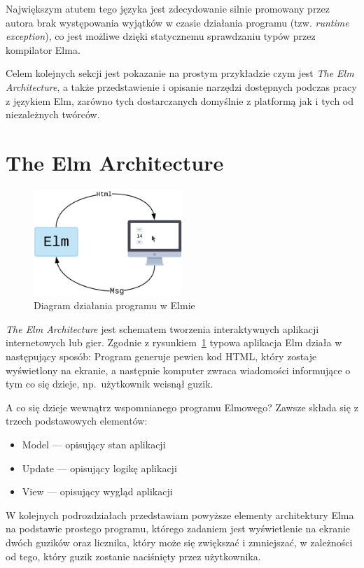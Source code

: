 \documentclass[twoside,a4paper]{report}
\begin{document}
Największym atutem tego języka jest zdecydowanie silnie promowany przez autora brak występowania wyjątków w czasie działania programu (tzw. \textit{runtime exception}), co jest możliwe dzięki statycznemu sprawdzaniu typów przez kompilator Elma.

Celem kolejnych sekcji jest pokazanie na prostym przykładzie czym jest \textit{The Elm Architecture}, a także przedstawienie i opisanie narzędzi dostępnych podczas pracy z językiem Elm, zarówno tych dostarczanych domyślnie z platformą jak i tych od niezależnych twórców.

\section{The Elm Architecture}
\begin{figure}[H]
    \centering
    \includegraphics[width=0.5\textwidth]{img/elm_arch.png}
    \caption{Diagram działania programu w Elmie}\label{fig:elm_arch}
\end{figure}

\textit{The Elm Architecture} jest schematem tworzenia interaktywnych aplikacji internetowych lub gier.
Zgodnie z rysunkiem~\ref{fig:elm_arch} typowa aplikacja Elm działa w następujący sposób:
Program generuje pewien kod HTML, który zostaje wyświetlony na ekranie, a następnie komputer zwraca wiadomości informujące o tym co się dzieje, np.~użytkownik wcisnął guzik.

A co się dzieje wewnątrz wspomnianego programu Elmowego? Zawsze składa się z trzech podstawowych elementów:
\begin{itemize}[noitemsep,topsep=0pt]
    \item Model --- opisujący stan aplikacji
    \item Update --- opisujący logikę aplikacji
    \item View --- opisujący wygląd aplikacji
\end{itemize}

W kolejnych podrozdziałach przedstawiam powyższe elementy architektury Elma na podstawie prostego programu, którego zadaniem jest wyświetlenie na ekranie dwóch guzików oraz licznika, który może się zwiększać i zmniejszać, w zależności od tego, który guzik zostanie naciśnięty przez użytkownika.
\end{document}
